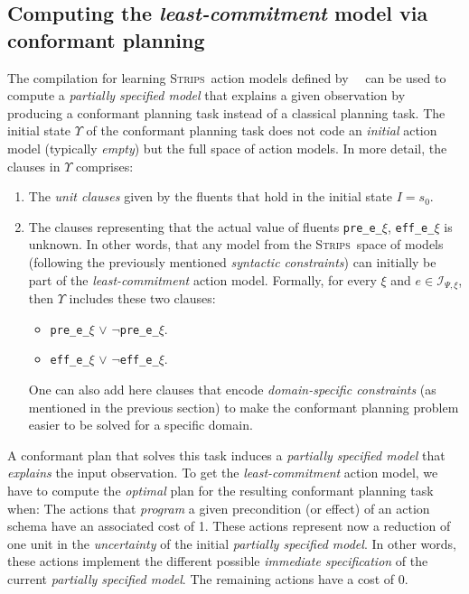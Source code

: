\documentclass{article}
\newcommand{\strips}{\textsc{Strips}}
\begin{document}
\subsection{Computing the {\em least-commitment} model via conformant planning}
The compilation for learning \strips\ action models defined by~\citeauthor{aineto2018learning}~\citeyear{aineto2018learning} can be used to compute a {\em partially specified model} that explains a given observation by producing a conformant planning task instead of a classical planning task. The initial state $\Upsilon$ of the conformant planning task does not code an {\em initial} action model (typically {\em empty}) but the full space of action models. In more detail, the clauses in $\Upsilon$ comprises:
      \begin{enumerate}
      \item The {\em unit clauses} given by the fluents that hold in the initial state $I=s_0$.
      \item The clauses representing that the actual value of fluents {\tt\small pre\_e\_$\xi$}, {\tt\small eff\_e\_$\xi$} is unknown. In other words, that any model from the \strips\ space of models (following the previously mentioned {\em syntactic constraints}) can initially be part of the {\em least-commitment} action model. Formally, for every $\xi$ and $e\in{\mathcal I}_{\Psi,\xi}$, then $\Upsilon$ includes these two clauses:
            \begin{itemize}
            \item {\tt\small pre\_e\_$\xi$} $\vee$ {\tt\small $\neg$pre\_e\_$\xi$}.
            \item {\tt\small eff\_e\_$\xi$} $\vee$ {\tt\small $\neg$eff\_e\_$\xi$}.
            \end{itemize}
            One can also add here clauses that encode {\em domain-specific constraints} (as mentioned in the previous section) to make the conformant planning problem easier to be solved for a specific domain.
      \end{enumerate}
A conformant plan that solves this task induces a {\em partially specified model} that {\em explains} the input observation. To get the {\em least-commitment} action model, we have to compute the {\em optimal} plan for the resulting conformant planning task when: The actions that {\em program} a given precondition (or effect) of an action schema have an associated cost of 1. These actions represent now a reduction of one unit in the {\em uncertainty} of the initial {\em partially specified model}. In other words, these actions implement the different possible {\em immediate specification} of the current {\em partially specified model}. The remaining actions have a cost of 0.
\end{document}
